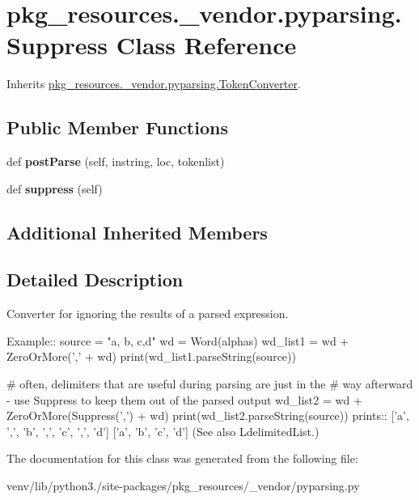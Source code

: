 \hypertarget{classpkg__resources_1_1__vendor_1_1pyparsing_1_1_suppress}{}\section{pkg\+\_\+resources.\+\_\+vendor.\+pyparsing.\+Suppress Class Reference}
\label{classpkg__resources_1_1__vendor_1_1pyparsing_1_1_suppress}


Inherits \hyperlink{classpkg__resources_1_1__vendor_1_1pyparsing_1_1_token_converter}{pkg\+\_\+resources.\+\_\+vendor.\+pyparsing.\+Token\+Converter}.

\subsection*{Public Member Functions}
\begin{DoxyCompactItemize}
\item 
\mbox{\label{classpkg__resources_1_1__vendor_1_1pyparsing_1_1_suppress_a65fa22954f7a5a732fcd5632839a8936}} 
def {\bfseries post\+Parse} (self, instring, loc, tokenlist)
\item 
\mbox{\label{classpkg__resources_1_1__vendor_1_1pyparsing_1_1_suppress_a66979fab93dbde807d28890e54de5fcc}} 
def {\bfseries suppress} (self)
\end{DoxyCompactItemize}
\subsection*{Additional Inherited Members}


\subsection{Detailed Description}
\begin{DoxyVerb}Converter for ignoring the results of a parsed expression.

Example::
    source = "a, b, c,d"
    wd = Word(alphas)
    wd_list1 = wd + ZeroOrMore(',' + wd)
    print(wd_list1.parseString(source))

    # often, delimiters that are useful during parsing are just in the
    # way afterward - use Suppress to keep them out of the parsed output
    wd_list2 = wd + ZeroOrMore(Suppress(',') + wd)
    print(wd_list2.parseString(source))
prints::
    ['a', ',', 'b', ',', 'c', ',', 'd']
    ['a', 'b', 'c', 'd']
(See also L{delimitedList}.)
\end{DoxyVerb}
 

The documentation for this class was generated from the following file\+:\begin{DoxyCompactItemize}
\item 
venv/lib/python3./site-\/packages/pkg\+\_\+resources/\+\_\+vendor/pyparsing.\+py\end{DoxyCompactItemize}

